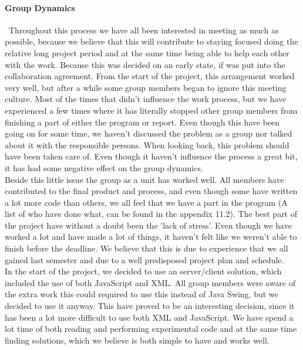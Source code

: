 \documentclass[a4paper,10pt,titlepage]{article}
\begin{document}
		\paragraph{Group Dynamics}\mbox{}\
		Throughout this process we have all been interested in meeting as much as possible, because we believe that this will contribute to staying focused doing the relative long project period and at the same time being able to help each other with the work. Because this was decided on an early state, if was put into the collaboration agreement. From the start of the project, this arrangement worked very well, but after a while some group members began to ignore this meeting culture. Most of the times that didn't influence the work process, but we have experienced a few times where it has literally stopped other group members from finishing a part of either the program or report. Even though this have been going on for some time, we haven't discussed the problem as a group nor talked about it with the responsible persons. When looking back, this problem should have been taken care of. Even though it haven't influence the process a great bit, it has had some negative effect on the group dynamics. \\
		Beside this little issue the group as a unit has worked well. All members have contributed to the final product and process, and even though some have written a lot more code than others, we all feel that we have a part in the program (A list of who have done what, can be found  in the appendix 11.2). The best part of the project have without a doubt been the 'lack of stress'. Even though we have worked a lot and have made a lot of things, it haven't felt like we weren't able to finish before the deadline. We believe that this is due to experience that we all gained last semester and due to a well predisposed project plan and schedule. \\


In the start of the project, we decided to use an server/client solution, which included the use of both JavaScript and XML. All group members were aware of the extra work this could required to use this instead of Java Swing, but we decided to use it anyway. This have proved to be an interesting decision, since it has been a lot more difficult to use both XML and JavaScript. We have spend a lot time of both reading and performing experimental code and at the same time finding solutions, which we believe is both simple to have and works well.\\
\end{document}
